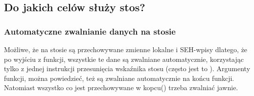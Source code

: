 \subsection{Do jakich celów służy stos?}



\EN{}
\RU{}
\PTBR{}




\subsubsection{Automatyczne zwalnianie danych na stosie}

Możliwe, że na stosie są przechowywane zmienne lokalne i SEH-wpisy dlatego, że po wyjściu z funkcji, wszystkie te dane są zwalniane automatycznie,
korzystając tylko z jednej instrukcji przesunięcia wskaźnika stosu (często jest to \ADD).
Argumenty funkcji, można powiedzieć, też są zwalniane automatycznie na końcu funkcji.
Natomiast wszystko co jest przechowywane w kopcu() trzeba zwalniać jawnie.

\EN{}
\RU{}
\PTBR{}
\PL{}




